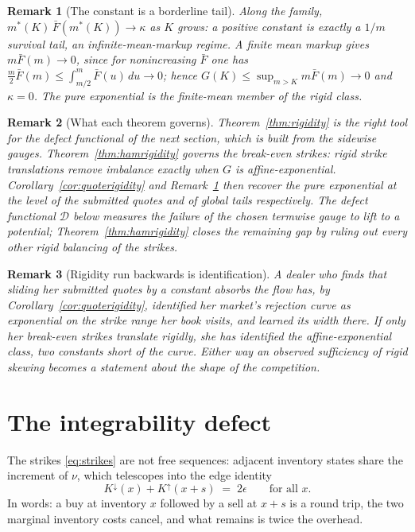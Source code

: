 \documentclass[11pt]{article}
\newtheorem{remark}{Remark}
\newcommand{\Fbar}{\bar F}
\begin{document}
\begin{remark}[The constant is a borderline tail]\label{rem:tail}
Along the family, $m^\ast(K)\,\Fbar(m^\ast(K)) \to \kappa$ as $K$ grows: a positive constant is exactly a $1/m$ survival tail, an infinite-mean-markup regime. A finite mean markup gives $m\Fbar(m) \to 0$, since for nonincreasing $\Fbar$ one has $\tfrac{m}{2}\Fbar(m) \le \int_{m/2}^{m}\Fbar(u)\,du \to 0$; hence $G(K) \le \sup_{m>K} m\Fbar(m) \to 0$ and $\kappa = 0$. The pure exponential is the finite-mean member of the rigid class.
\end{remark}

\begin{remark}[What each theorem governs]
Theorem~\ref{thm:rigidity} is the right tool for the defect functional of the next section, which is built from the sidewise gauges. Theorem~\ref{thm:hamrigidity} governs the break-even strikes: rigid strike translations remove imbalance exactly when $G$ is affine-exponential. Corollary~\ref{cor:quoterigidity} and Remark~\ref{rem:tail} then recover the pure exponential at the level of the submitted quotes and of global tails respectively. The defect functional $\mathcal D$ below measures the failure of the \emph{chosen termwise gauge} to lift to a potential; Theorem~\ref{thm:hamrigidity} closes the remaining gap by ruling out every other rigid balancing of the strikes.
\end{remark}

\begin{remark}[Rigidity run backwards is identification]
A dealer who finds that sliding her \emph{submitted quotes} by a constant absorbs the flow has, by Corollary~\ref{cor:quoterigidity}, identified her market's rejection curve as exponential on the strike range her book visits, and learned its width there. If only her break-even strikes translate rigidly, she has identified the affine-exponential class, two constants short of the curve. Either way an observed sufficiency of rigid skewing becomes a statement about the shape of the competition.
\end{remark}

\section{The integrability defect}\label{sec:defect}

The strikes \eqref{eq:strikes} are not free sequences: adjacent inventory states share the increment of $\nu$, which telescopes into the edge identity
\begin{equation}
K^{\downarrow}(x) + K^{\uparrow}(x+s) \;=\; 2\epsilon \qquad\text{for all } x .
\label{eq:edge}
\end{equation}
In words: a buy at inventory $x$ followed by a sell at $x+s$ is a round trip, the two marginal inventory costs cancel, and what remains is twice the overhead.
\end{document}
